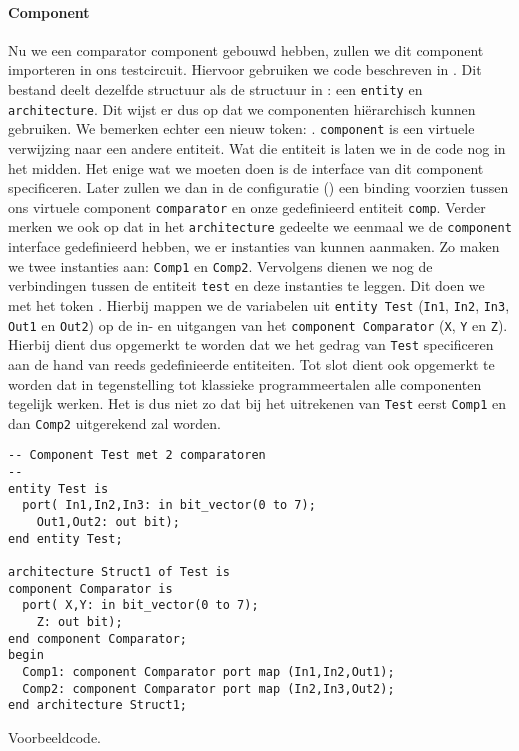 \paragraph{Component} Nu we een comparator component gebouwd hebben, zullen we dit component importeren in ons testcircuit. Hiervoor gebruiken we code beschreven in . Dit bestand deelt dezelfde structuur als de structuur in : een \texttt{entity} en \texttt{architecture}. Dit wijst er dus op dat we componenten hi\"erarchisch kunnen gebruiken. We bemerken echter een nieuw token: . \texttt{component} is een virtuele verwijzing naar een andere entiteit. Wat die entiteit is laten we in de code nog in het midden. Het enige wat we moeten doen is de interface van dit component specificeren. Later zullen we dan in de configuratie () een binding voorzien tussen ons virtuele component \texttt{comparator} en onze gedefinieerd entiteit \texttt{comp}. Verder merken we ook op dat in het \texttt{architecture} gedeelte we eenmaal we de \texttt{component} interface gedefinieerd hebben, we er instanties van kunnen aanmaken. Zo maken we twee instanties aan: \texttt{Comp1} en \texttt{Comp2}. Vervolgens dienen we nog de verbindingen tussen de entiteit \texttt{test} en deze instanties te leggen. Dit doen we met het token . Hierbij mappen we de variabelen uit \texttt{entity Test} (\texttt{In1}, \texttt{In2}, \texttt{In3}, \texttt{Out1} en \texttt{Out2}) op de in- en uitgangen van het \texttt{component Comparator} (\texttt{X}, \texttt{Y} en \texttt{Z}). Hierbij dient dus opgemerkt te worden dat we het gedrag van \texttt{Test} specificeren aan de hand van reeds gedefinieerde entiteiten. Tot slot dient ook opgemerkt te worden dat in tegenstelling tot klassieke programmeertalen alle componenten tegelijk werken. Het is dus niet zo dat bij het uitrekenen van \texttt{Test} eerst \texttt{Comp1} en dan \texttt{Comp2} uitgerekend zal worden.
\begin{vhdlcode}
\centering
\begin{lstlisting}
-- Component Test met 2 comparatoren
--
entity Test is
  port(	In1,In2,In3: in bit_vector(0 to 7);
	Out1,Out2: out bit);
end entity Test;

architecture Struct1 of Test is
component Comparator is
  port(	X,Y: in bit_vector(0 to 7);
	Z: out bit);
end component Comparator;
begin
  Comp1: component Comparator port map (In1,In2,Out1);
  Comp2: component Comparator port map (In2,In3,Out2);
end architecture Struct1;
\end{lstlisting}
\caption{Voorbeeldcode.}
\label{vhdl:test}
\end{vhdlcode}
